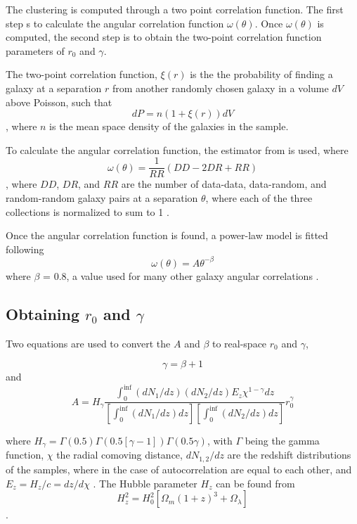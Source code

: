 The clustering is computed through a two point correlation function. The first step s to calculate the angular correlation function $ \omega(\theta)$. Once $ \omega(\theta)$ is computed, the second step is to obtain the two-point correlation function parameters of $r_0$ and $\gamma$.

The two-point correlation function, $ \xi(r)$ is the the probability of finding a galaxy at a separation $r$ from another randomly chosen galaxy in a volume $dV$ above Poisson, such that $$ dP = n(1 + \xi(r))dV $$, where $n$ is the mean space density of the galaxies in the sample\cite{hickox2011clustering}. 

To calculate the angular correlation function, the estimator from \cite{1993ApJ...412...64L} is used, where $$ \omega(\theta) = \frac{1}{RR}(DD-2DR + RR)$$, where $DD$, $DR$, and $RR$ are the number of data-data, data-random, and random-random galaxy pairs at a separation $\theta$, where each of the three collections is normalized to sum to 1 \cite{hickox2011clustering}.

Once the angular correlation function is found, a power-law model is fitted following $$\omega(\theta) = A\theta^{-\beta} $$ where $\beta$ = 0.8, a value used for many other galaxy angular correlations \cite{hickox2011clustering}.

\subsection{Obtaining $r_0$ and $\gamma$}

Two equations are used to convert the $A$ and $\beta$ to real-space $r_0$ and $\gamma$, 

$$ \gamma = \beta + 1 $$ and $$ A = H_{\gamma}\frac{\int_{0}^{\inf} (dN_1/dz)(dN_2/dz)E_z\chi^{1 - \gamma} dz}{[\int_{0}^{\inf} (dN_1/dz)dz][\int_{0}^{\inf} (dN_2/dz)dz]}r_0^{\gamma}$$

where $H_{\gamma} = \Gamma(0.5)\Gamma(0.5[\gamma -1])\Gamma(0.5\gamma)$, with $\Gamma$ being the gamma function, $\chi$ the radial comoving distance, $dN_{1,2}/dz$ are the redshift distributions of the samples, where in the case of autocorrelation are equal to each other, and $E_z = H_z/c = dz/d\chi$ \cite{hickox2011clustering}. The Hubble parameter $H_z$ can be found from
$$H_z^2 = H_0^2[\Omega_m(1+z)^3 + \Omega_{\lambda}]$$ \cite{hickox2011clustering}.

